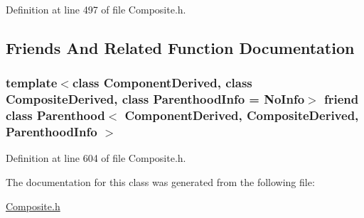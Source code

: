 Definition at line 497 of file Composite.\+h.



\subsection{Friends And Related Function Documentation}
\subsubsection[{\texorpdfstring{Parenthood$<$ Component\+Derived, Composite\+Derived, Parenthood\+Info $>$}{Parenthood< ComponentDerived, CompositeDerived, ParenthoodInfo >}}]{\setlength{\rightskip}{0pt plus 5cm}template$<$class Component\+Derived, class Composite\+Derived, class Parenthood\+Info = No\+Info$>$ friend class {\bf Parenthood}$<$ Component\+Derived, Composite\+Derived, Parenthood\+Info $>$\hspace{0.3cm}{\ttfamily [friend]}}\hypertarget{classocra_1_1Component_ad71e675afae5fce6263d2d784cd3907a}{}\label{classocra_1_1Component_ad71e675afae5fce6263d2d784cd3907a}


Definition at line 604 of file Composite.\+h.



The documentation for this class was generated from the following file\+:\begin{DoxyCompactItemize}
\item 
\hyperlink{Composite_8h}{Composite.\+h}\end{DoxyCompactItemize}
